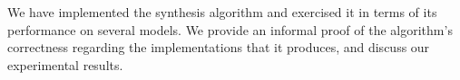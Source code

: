 
We have implemented the synthesis
algorithm and exercised it in terms of its performance on several models. We
provide an informal proof of the algorithm's correctness regarding the
implementations that it produces, and discuss our experimental results.

\fi 

